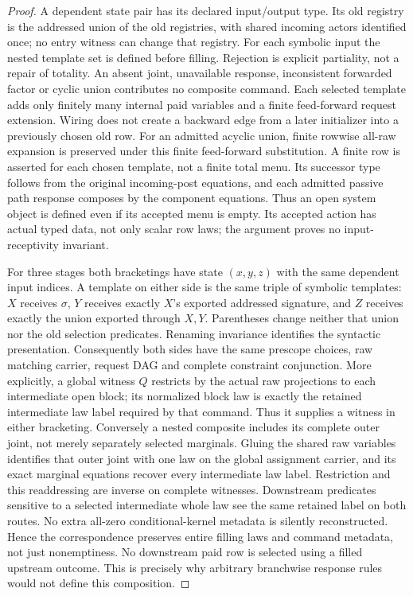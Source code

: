 \documentclass[11pt]{article}\usepackage{amsmath,amssymb,amsthm,geometry}\geometry{margin=1in}
\begin{document}
\begin{proof}
A dependent state pair has its declared input/output type. Its old registry is the addressed union of the old registries, with shared incoming actors identified once; no entry witness can change that registry. For each symbolic input the nested template set is defined before filling. Rejection is explicit partiality, not a repair of totality. An absent joint, unavailable response, inconsistent forwarded factor or cyclic union contributes no composite command. Each selected template adds only finitely many internal paid variables and a finite feed-forward request extension. Wiring does not create a backward edge from a later initializer into a previously chosen old row. For an admitted acyclic union, finite rowwise all-raw expansion is preserved under this finite feed-forward substitution. A finite row is asserted for each chosen template, not a finite total menu. Its successor type follows from the original incoming-post equations, and each admitted passive path response composes by the component equations. Thus an open system object is defined even if its accepted menu is empty. Its accepted action has actual typed data, not only scalar row laws; the argument proves no input-receptivity invariant.

For three stages both bracketings have state $(x,y,z)$ with the same dependent input indices. A template on either side is the same triple of symbolic templates: $X$ receives $\sigma$, $Y$ receives exactly $X$'s exported addressed signature, and $Z$ receives exactly the union exported through $X,Y$. Parentheses change neither that union nor the old selection predicates. Renaming invariance identifies the syntactic presentation. Consequently both sides have the same prescope choices, raw matching carrier, request DAG and complete constraint conjunction. More explicitly, a global witness $Q$ restricts by the actual raw projections to each intermediate open block; its normalized block law is exactly the retained intermediate law label required by that command. Thus it supplies a witness in either bracketing. Conversely a nested composite includes its complete outer joint, not merely separately selected marginals. Gluing the shared raw variables identifies that outer joint with one law on the global assignment carrier, and its exact marginal equations recover every intermediate law label. Restriction and this readdressing are inverse on complete witnesses. Downstream predicates sensitive to a selected intermediate whole law see the same retained label on both routes. No extra all-zero conditional-kernel metadata is silently reconstructed. Hence the correspondence preserves entire filling laws and command metadata, not just nonemptiness. No downstream paid row is selected using a filled upstream outcome. This is precisely why arbitrary branchwise response rules would not define this composition.


\end{proof}
\end{document}
